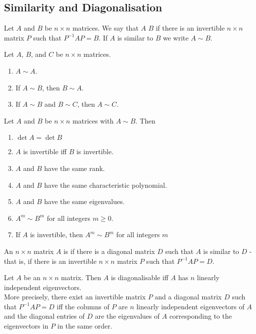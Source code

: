 \documentclass{article}
\begin{document}
\subsection{Similarity and Diagonalisation}
\begin{definition}
    Let $A$ and $B$ be $n\times n$ matrices. We say that $A$  $B$ if there is an invertible $n\times n$ matrix $P$ such that $P^{-1}AP=B$. If $A$ is similar to $B$ we write $A\sim B$.
\end{definition}
\begin{theorem}
    Let $A$, $B$, and $C$ be $n\times n$ matrices.
    \begin{enumerate}
        \item $A\sim A$.
        \item If $A\sim B$, then $B\sim A$.
        \item If $A\sim B$ and $B\sim C$, then $A\sim C$.
    \end{enumerate}
\end{theorem}
\begin{theorem}
    Let $A$ and $B$ be $n\times n$ matrices with $A\sim B$. Then
    \begin{enumerate}
        \item $\det A = \det B$
        \item $A$ is invertible iff $B$ is invertible.
        \item $A$ and $B$ have the same rank.
        \item $A$ and $B$ have the same characteristic polynomial.
        \item $A$ and $B$ have the same eigenvalues.
        \item $A^m\sim B^m$ for all integers $m\geq 0$.
        \item If $A$ is invertible, then $A^m\sim B^m$ for all integers $m$
    \end{enumerate}
\end{theorem}
\begin{definition}
    An $n\times n$ matrix $A$ is  if there is a diagonal matrix $D$ such that $A$ is similar to $D$ - that is, if there is an invertible $n\times n$ matrix $P$ such that $P^{-1}AP = D$.
\end{definition}
\begin{theorem}
    Let $A$ be an $n\times n$ matrix. Then $A$ is diagonalisable iff $A$ has $n$ linearly independent eigenvectors.\\
    More precisely, there exist an invertible matrix $P$ and a diagonal matrix $D$ such that $P^{-1}AP=D$ iff the columns of $P$ are $n$ linearly independent eigenvectors of $A$ and the diagonal entries of $D$ are the eigenvalues of $A$ corresponding to the eigenvectors in $P$ in the same order.
\end{theorem}
\end{document}
